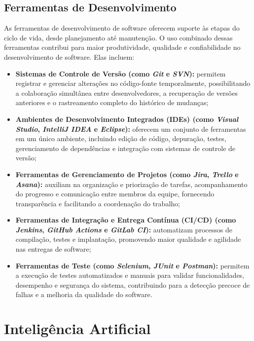 \subsection{Ferramentas de Desenvolvimento}

As ferramentas de desenvolvimento de software oferecem suporte às etapas do ciclo de vida, desde planejamento até manutenção. O uso combinado dessas ferramentas contribui para maior produtividade, qualidade e confiabilidade no desenvolvimento de software. Elas incluem:

\begin{itemize}
    \item \textbf{Sistemas de Controle de Versão (como \emph{Git} e \emph{SVN}):} permitem registrar e gerenciar alterações no código-fonte temporalmente, possibilitando a colaboração simultânea entre desenvolvedores, a recuperação de versões anteriores e o rastreamento completo do histórico de mudanças;

    \item \textbf{Ambientes de Desenvolvimento Integrados (IDEs) (como \emph{Visual Studio}, \emph{IntelliJ IDEA} e \emph{Eclipse}):} oferecem um conjunto de ferramentas em um único ambiente, incluindo edição de código, depuração, testes, gerenciamento de dependências e integração com sistemas de controle de versão;

    \item \textbf{Ferramentas de Gerenciamento de Projetos (como \emph{Jira}, \emph{Trello} e \emph{Asana}):} auxiliam na organização e priorização de tarefas, acompanhamento do progresso e comunicação entre membros da equipe, fornecendo transparência e facilitando a coordenação do trabalho;

    \item \textbf{Ferramentas de Integração e Entrega Contínua (CI/CD) (como \emph{Jenkins}, \emph{GitHub Actions} e \emph{GitLab CI}):} automatizam processos de compilação, testes e implantação, promovendo maior qualidade e agilidade nas entregas de software;

    \item \textbf{Ferramentas de Teste (como \emph{Selenium}, \emph{JUnit} e \emph{Postman}):} permitem a execução de testes automatizados e manuais para validar funcionalidades, desempenho e segurança do sistema, contribuindo para a detecção precoce de falhas e a melhoria da qualidade do software.
\end{itemize}

\section{Inteligência Artificial}
